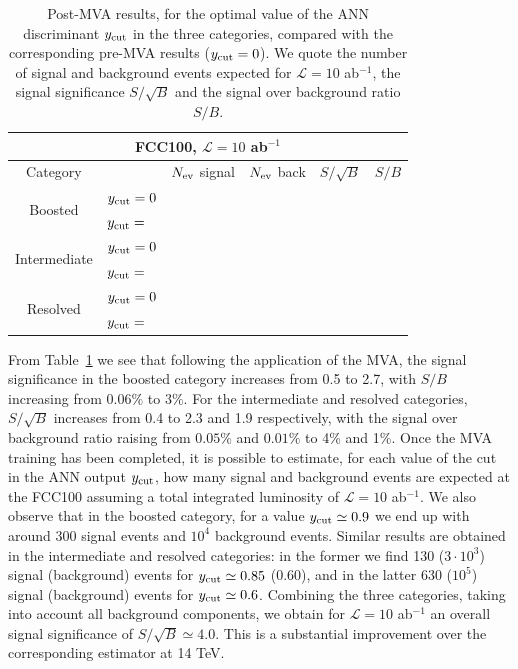\documentclass[a4paper,11pt]{article}
\begin{document}
\begin{table}[t]
  \centering
  \begin{tabular}{|c|l|c|c|c|c|}
    \hline
    \multicolumn{6}{|c|}{FCC100, $\mathcal{L}=10$ ab$^{-1}$} \\
    \hline
    \hline
    Category  &   &  $N_{\rm ev}$ signal &  $N_{\rm ev}$ back  &  $S/\sqrt{B}$ & $S/B$ \\ 
    \hline
    \hline
    \multirow{2}{*}{Boosted} &  $y_{\rm cut}=0$  &        &           &          &         \\
    &  $y_{\rm cut}=$ &       &           &          &         \\
    \hline
    \hline
    \multirow{2}{*}{Intermediate} &  $y_{\rm cut}=0$  &        &           &          &         \\
       &  $y_{\rm cut}=$ &       &           &          &         \\
    \hline
    \hline
      \multirow{2}{*}{Resolved} &  $y_{\rm cut}=0$  &         &           &          &         \\
    &  $y_{\rm cut}= $ &        &           &          &         \\
    \hline
      \end{tabular}
  \caption{\small Post-MVA results, for the optimal value of the
    ANN discriminant $y_{\rm cut}$ in the three categories, compared with the
    corresponding
    pre-MVA results ($y_{\rm cut}=0$).
    We quote the number of signal and
    background events expected for $\mathcal{L}=10$ ab$^{-1}$,
    the signal significance $S/\sqrt{B}$ and
    the signal over background ratio $S/B$.
    \label{table:cutflowMVA}
  }
\end{table}


From Table~\ref{table:cutflowMVA} we see that
following the application of the MVA, 
the signal significance in the boosted category increases
from 0.5 to 2.7, with $S/B$ increasing from $0.06\%$ to $3\%$.
%
For the intermediate and resolved categories, $S/\sqrt{B}$
increases from 0.4 to 2.3 and 1.9 respectively, with
the signal over background ratio raising from
$0.05\%$ and $0.01\%$ to 4\% and 1\%.
%
Once the MVA training has been completed, it is possible
to estimate, for each value of
the cut in the ANN output $y_{\rm cut}$, how many
signal and background events are expected at the FCC100
assuming a total integrated luminosity of
 $\mathcal{L}=10$ ab$^{-1}$.
%
We also observe that
in the boosted category, for a value $y_{\rm cut}\simeq 0.9$
we end up with around 300 signal events and $10^4$ background
events.
%
Similar results are obtained in the intermediate and resolved
categories: in the former we find 130 ($3\cdot 10^3$) signal (background)
events for $y_{\rm cut}\simeq 0.85$ (0.60), and in the latter
630 ($10^5$) signal (background) events for
$y_{\rm cut}\simeq 0.6$.
%
Combining the three categories, taking into
account all background components, we obtain for
$\mathcal{L}=10$ ab$^{-1}$ an overall signal
significance of $S/\sqrt{B}\simeq 4.0$.
%
This is a substantial improvement over the corresponding
estimator at 14 TeV.
\end{document}
